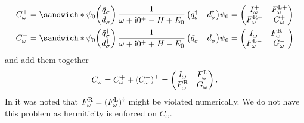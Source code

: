 \begin{subequations}
    \begin{align}
        C^+_\omega
         & =
        \sandwich*
        {\psi_0}
        {
            \begin{pmatrix}
                \tilde q^{\pdag}_\sigma \\
                d^{\pdag}_\sigma
            \end{pmatrix}
            \frac{1}{\omega + \mi0^+ - H + E_0}
            \begin{pmatrix}
                \tilde q^\dag_\sigma & d^\dag_\sigma
            \end{pmatrix}
        }
        {\psi_0}
        =
        \begin{pmatrix}
            I^+_\omega      & F^{\mL+}_\omega \\
            F^{\mR+}_\omega & G^+_\omega
        \end{pmatrix} \\
        C^-_\omega
         & =
        \sandwich*
        {\psi_0}
        {
            \begin{pmatrix}
                \tilde q^\dag_\sigma \\
                d^\dag_\sigma
            \end{pmatrix}
            \frac{1}{\omega + \mi0^+ + H - E_0}
            \begin{pmatrix}
                \tilde q^{\pdag}_\sigma & d^{\pdag}_\sigma
            \end{pmatrix}
        }
        {\psi_0}
        =
        \begin{pmatrix}
            I^-_\omega      & F^{\mR-}_\omega \\
            F^{\mL-}_\omega & G^-_\omega
        \end{pmatrix}
    \end{align}
\end{subequations}
and add them together
\begin{equation}
    C_\omega
    =
    C^+_\omega + (C^-_\omega)^\top
    =
    \begin{pmatrix}
        I_\omega       & F^{\mathrm{L}}_\omega \\
        F^{\mathrm{R}}_\omega & G_\omega
    \end{pmatrix}.
\end{equation}
In \cite{Kugler2022} it was noted that $F^{\mathrm{R}}_\omega = (F^{\mathrm{L}}_\omega)^\dag$
might be violated numerically.
We do not have this problem as hermiticity is enforced on $C_\omega$.

